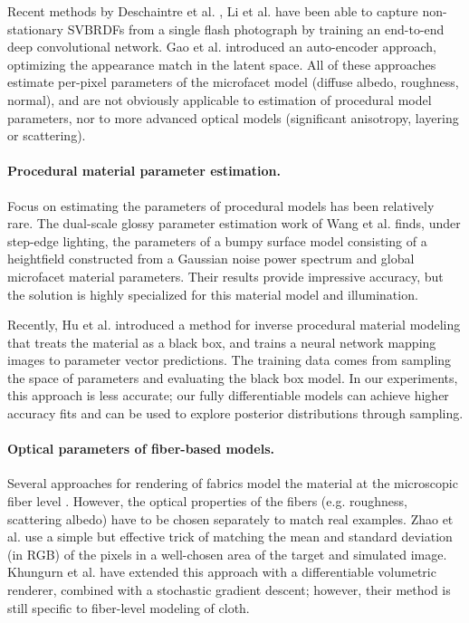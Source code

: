 Recent methods by Deschaintre et al. \cite{Deschaintre2018}, Li et al. \cite{Li2018} have been able to capture non-stationary SVBRDFs from a single flash photograph by training an end-to-end deep convolutional network. Gao et al. \cite{Gao2019} introduced an auto-encoder approach, optimizing the appearance match in the latent space. All of these approaches estimate per-pixel parameters of the microfacet model (diffuse albedo, roughness, normal), and are not obviously applicable to estimation of procedural model parameters, nor to more advanced optical models (significant anisotropy, layering or scattering).

\paragraph{Procedural material parameter estimation.} Focus on estimating the parameters of procedural models has been relatively rare. The dual-scale glossy parameter estimation work of Wang et al. \cite{Wang2011} finds, under step-edge lighting, the parameters of a bumpy surface model consisting of a heightfield constructed from a Gaussian noise power spectrum and global microfacet material parameters. Their results provide impressive accuracy, but the solution is highly specialized for this material model and illumination.

Recently, Hu et al. \cite{Hu2019} introduced a method for inverse procedural material modeling that treats the material as a black box, and trains a neural network mapping images to parameter vector predictions. The training data comes from sampling the space of parameters and evaluating the black box model. In our experiments, this approach is less accurate; our fully differentiable models can achieve higher accuracy fits and can be used to explore posterior distributions through sampling.

\paragraph{Optical parameters of fiber-based models.} Several approaches for rendering of fabrics model the material at the microscopic fiber level \cite{Zhao2011,Zhao2016,Leaf2018}. However, the optical properties of the fibers (e.g. roughness, scattering albedo) have to be chosen separately to match real examples. Zhao et al. \cite{Zhao2011} use a simple but effective trick of matching the mean and standard deviation (in RGB) of the pixels in a well-chosen area of the target and simulated image. Khungurn et al. \cite{Khungurn2015} have extended this approach with a differentiable volumetric renderer, combined with a stochastic gradient descent; however, their method is still specific to fiber-level modeling of cloth.

